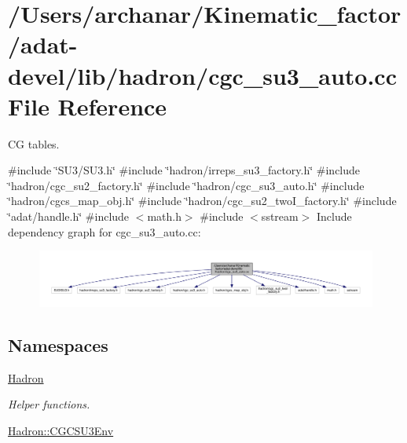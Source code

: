 \hypertarget{adat-devel_2lib_2hadron_2cgc__su3__auto_8cc}{}\section{/\+Users/archanar/\+Kinematic\+\_\+factor/adat-\/devel/lib/hadron/cgc\+\_\+su3\+\_\+auto.cc File Reference}
\label{adat-devel_2lib_2hadron_2cgc__su3__auto_8cc}


CG tables.  


{\ttfamily \#include \char`\"{}S\+U3/\+S\+U3.\+h\char`\"{}}\newline
{\ttfamily \#include \char`\"{}hadron/irreps\+\_\+su3\+\_\+factory.\+h\char`\"{}}\newline
{\ttfamily \#include \char`\"{}hadron/cgc\+\_\+su2\+\_\+factory.\+h\char`\"{}}\newline
{\ttfamily \#include \char`\"{}hadron/cgc\+\_\+su3\+\_\+auto.\+h\char`\"{}}\newline
{\ttfamily \#include \char`\"{}hadron/cgcs\+\_\+map\+\_\+obj.\+h\char`\"{}}\newline
{\ttfamily \#include \char`\"{}hadron/cgc\+\_\+su2\+\_\+two\+I\+\_\+factory.\+h\char`\"{}}\newline
{\ttfamily \#include \char`\"{}adat/handle.\+h\char`\"{}}\newline
{\ttfamily \#include $<$math.\+h$>$}\newline
{\ttfamily \#include $<$sstream$>$}\newline
Include dependency graph for cgc\+\_\+su3\+\_\+auto.\+cc\+:
\nopagebreak
\begin{figure}[H]
\begin{center}
\leavevmode
\includegraphics[width=350pt]{d9/dee/adat-devel_2lib_2hadron_2cgc__su3__auto_8cc__incl}
\end{center}
\end{figure}
\subsection*{Namespaces}
\begin{DoxyCompactItemize}
\item 
 \mbox{\hyperlink{namespaceHadron}{Hadron}}
\begin{DoxyCompactList}\small\item\em Helper functions. \end{DoxyCompactList}\item 
 \mbox{\hyperlink{namespaceHadron_1_1CGCSU3Env}{Hadron\+::\+C\+G\+C\+S\+U3\+Env}}
\end{DoxyCompactItemize}
